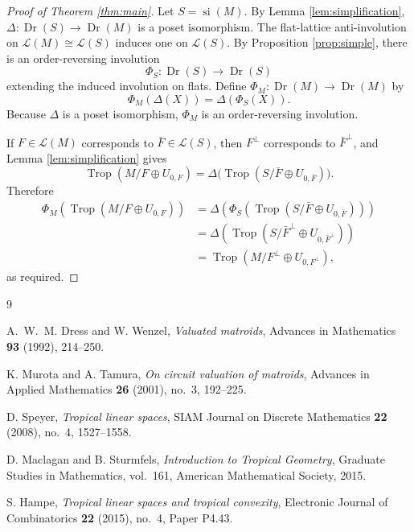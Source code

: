 \documentclass[12pt]{article}
\theoremstyle{definition}
\newcommand{\Trop}{\operatorname{Trop}}
\newcommand{\Dr}{\operatorname{Dr}}
\newcommand{\cL}{\mathcal L}
\begin{document}
\begin{proof}[Proof of Theorem \ref{thm:main}]
Let \(S=\operatorname{si}(M)\).  By Lemma \ref{lem:simplification}, \(\Delta:\Dr(S)\to\Dr(M)\) is a poset isomorphism.  The flat-lattice anti-involution on \(\cL(M)\cong\cL(S)\) induces one on \(\cL(S)\).  By Proposition \ref{prop:simple}, there is an order-reversing involution
\[
\Phi_S:\Dr(S)\to\Dr(S)
\]
extending the induced involution on flats.  Define \(\Phi_M:\Dr(M)\to\Dr(M)\) by
\[
\Phi_M(\Delta(X))=\Delta(\Phi_S(X)).
\]
Because \(\Delta\) is a poset isomorphism, \(\Phi_M\) is an order-reversing involution.

If \(F\in\cL(M)\) corresponds to \(\bar F\in\cL(S)\), then \(F^\perp\) corresponds to \(\bar F^\perp\), and Lemma \ref{lem:simplification} gives
\[
\Trop(M/F\oplus U_{0,F})
=
\Delta\bigl(\Trop(S/\bar F\oplus U_{0,\bar F})\bigr).
\]
Therefore
\[
\begin{aligned}
\Phi_M\!\left(\Trop(M/F\oplus U_{0,F})\right)
&=
\Delta\!\left(\Phi_S\!\left(\Trop(S/\bar F\oplus U_{0,\bar F})\right)\right)\\
&=
\Delta\!\left(\Trop(S/\bar F^\perp\oplus U_{0,\bar F^\perp})\right)\\
&=
\Trop(M/F^\perp\oplus U_{0,F^\perp}),
\end{aligned}
\]
as required.
\end{proof}

\begin{thebibliography}{9}

A.~W.~M. Dress and W. Wenzel,
\emph{Valuated matroids},
Advances in Mathematics \textbf{93} (1992), 214--250.

K. Murota and A. Tamura,
\emph{On circuit valuation of matroids},
Advances in Applied Mathematics \textbf{26} (2001), no.~3, 192--225.

D. Speyer,
\emph{Tropical linear spaces},
SIAM Journal on Discrete Mathematics \textbf{22} (2008), no.~4, 1527--1558.

D. Maclagan and B. Sturmfels,
\emph{Introduction to Tropical Geometry},
Graduate Studies in Mathematics, vol.~161, American Mathematical Society, 2015.

S. Hampe,
\emph{Tropical linear spaces and tropical convexity},
Electronic Journal of Combinatorics \textbf{22} (2015), no.~4, Paper P4.43.

\end{thebibliography}
\end{document}

